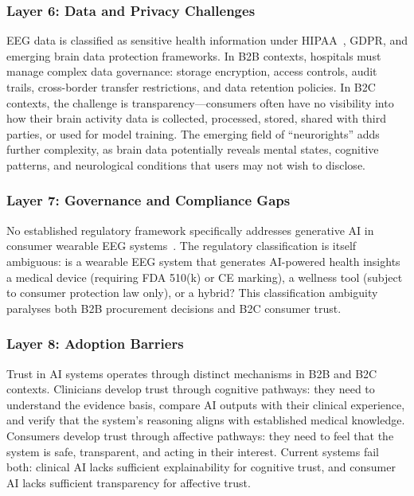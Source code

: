\subsubsection{Layer 6: Data and Privacy Challenges}

EEG data is classified as sensitive health information under HIPAA~\cite{hipaa1996}, GDPR, and emerging brain data protection frameworks. In B2B contexts, hospitals must manage complex data governance: storage encryption, access controls, audit trails, cross-border transfer restrictions, and data retention policies. In B2C contexts, the challenge is transparency---consumers often have no visibility into how their brain activity data is collected, processed, stored, shared with third parties, or used for model training. The emerging field of ``neurorights'' adds further complexity, as brain data potentially reveals mental states, cognitive patterns, and neurological conditions that users may not wish to disclose.

\subsubsection{Layer 7: Governance and Compliance Gaps}

No established regulatory framework specifically addresses generative AI in consumer wearable EEG systems~\cite{fda2021aiml}. The regulatory classification is itself ambiguous: is a wearable EEG system that generates AI-powered health insights a medical device (requiring FDA 510(k) or CE marking), a wellness tool (subject to consumer protection law only), or a hybrid? This classification ambiguity paralyses both B2B procurement decisions and B2C consumer trust.

\subsubsection{Layer 8: Adoption Barriers}

Trust in AI systems operates through distinct mechanisms in B2B and B2C contexts. Clinicians develop trust through cognitive pathways: they need to understand the evidence basis, compare AI outputs with their clinical experience, and verify that the system's reasoning aligns with established medical knowledge. Consumers develop trust through affective pathways: they need to feel that the system is safe, transparent, and acting in their interest. Current systems fail both: clinical AI lacks sufficient explainability for cognitive trust, and consumer AI lacks sufficient transparency for affective trust.

